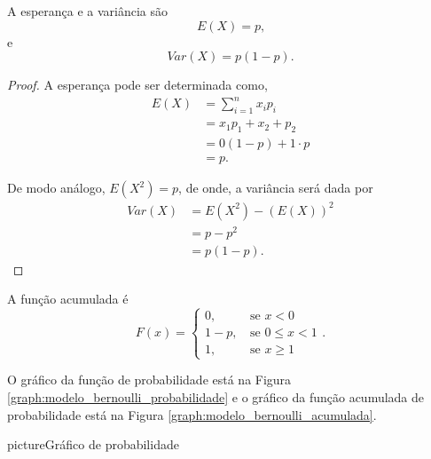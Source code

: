 A esperança e a variância são
\begin{equation}
	E(X)=p\text{,}
\end{equation}
e
\begin{equation}
	Var(X)=p(1-p)\text{.}
\end{equation}

\begin{proof}
	A esperança pode ser determinada como,
	\begin{align*}
		E(X)&=\sum_{i=1}^{n} x_i p_i\\
			&=x_1 p_1 + x_2 + p_2\\
			&=0(1-p)+1\cdot p\\
			&=p\text{.}
	\end{align*}

	De modo análogo, $E(X^2)=p$, de onde, a variância será dada por
	\begin{align*}
		Var(X) &= E(X^2)-(E(X))^2\\
			   &= p-p^2\\
			   &= p(1-p)\text{.}
	\end{align*}
\end{proof}

A função acumulada é
\begin{equation}
	F(x)=\begin{cases}
		0\text{,}&\text{ se }x < 0\\
		1-p\text{,}&\text{ se }0\leqslant x < 1\\
		1\text{,}&\text{ se } x\geqslant 1
	\end{cases}
	\text{.}
\end{equation}

O gráfico da função de probabilidade está na Figura \ref{graph:modelo_bernoulli_probabilidade} e o gráfico da função acumulada de probabilidade está na Figura \ref{graph:modelo_bernoulli_acumulada}.

\begin{sidepicture}{7cm}{picture}{Gráfico de probabilidade}
	\label{graph:modelo_bernoulli_probabilidade}
	\centering
\end{sidepicture}

